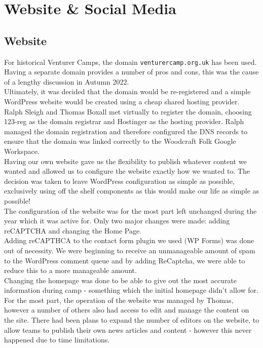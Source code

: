 \chapter{Website \& Social Media}
\section{Website}
For historical Venturer Camps, the domain \texttt{venturercamp.org.uk} has been used. Having a separate domain provides a number of pros and cons, this was the cause of a lengthy discussion in Autumn 2022.\\

Ultimately, it was decided that the domain would be re-registered and a simple WordPress website would be created using a cheap shared hosting provider. Ralph Sleigh and Thomas Boxall met virtually to register the domain, choosing 123-reg as the domain registrar and Hostinger as the hosting provider. Ralph managed the domain registration and therefore configured the DNS records to ensure that the domain was linked correctly to the Woodcraft Folk Google Workspace.\\

Having our own website gave us the flexibility to publish whatever content we wanted and allowed us to configure the website exactly how we wanted to. The decision was taken to leave WordPress configuration as simple as possible, exclusively using off the shelf components as this would make our life as simple as possible! \\

The configuration of the website was for the most part left unchanged during the year which it was active for. Only two major changes were made: adding reCAPTCHA and changing the Home Page. \\
Adding reCAPTHCA to the contact form plugin we used (WP Forms) was done out of necessity. We were beginning to receive an unmanageable amount of spam to the WordPress comment queue and by adding ReCaptcha, we were able to reduce this to a more manageable amount. \\
Changing the homepage was done to be able to give out the most accurate information during camp - something which the initial homepage didn't allow for. \\

For the most part, the operation of the website was managed by Thomas, however a number of others also had access to edit and manage the content on the site. There had been plans to expand the number of editors on the website, to allow teams to publish their own news articles and content - however this never happened due to time limitations.

